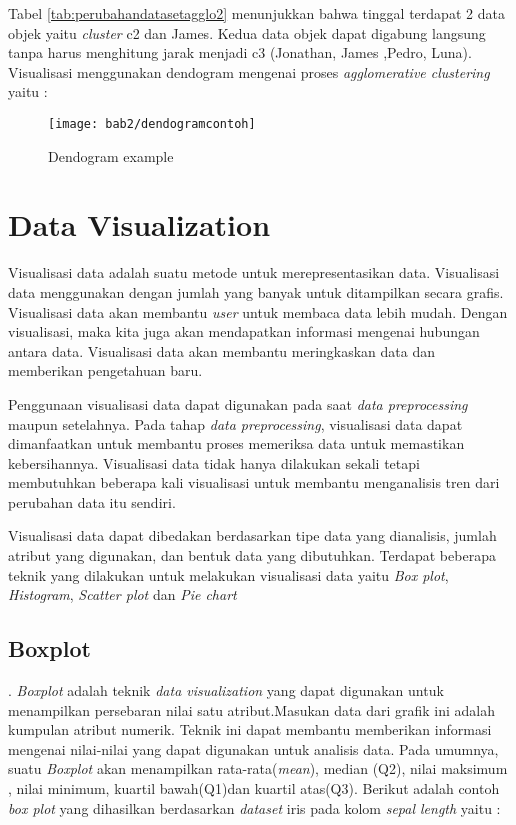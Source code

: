 Tabel \ref{tab:perubahandatasetagglo2} menunjukkan bahwa tinggal terdapat 2 data objek yaitu \textit{cluster}
c2 dan James. Kedua data objek dapat digabung langsung tanpa harus menghitung jarak menjadi c3 (Jonathan, James ,Pedro, Luna). Visualisasi menggunakan dendogram mengenai proses \textit{agglomerative clustering} yaitu : 


\begin{figure}[h!]
	\centering  
	\texttt{[image: bab2/dendogramcontoh]}   
	
	\label{ref:dendogramcontoh} 	
	\caption{Dendogram example}
\end{figure} 

\section{Data Visualization} 
Visualisasi data adalah suatu metode untuk merepresentasikan data. Visualisasi data menggunakan dengan jumlah yang banyak untuk ditampilkan secara grafis. Visualisasi data akan membantu \textit{user} untuk membaca data lebih mudah. Dengan visualisasi, maka kita juga akan mendapatkan informasi mengenai hubungan antara data. Visualisasi data akan membantu meringkaskan data dan memberikan pengetahuan baru. 
		
Penggunaan visualisasi data dapat digunakan pada saat \textit{data preprocessing} maupun setelahnya. Pada tahap \textit{data preprocessing}, visualisasi data dapat dimanfaatkan untuk membantu proses memeriksa data untuk memastikan kebersihannya. Visualisasi data tidak hanya dilakukan sekali tetapi membutuhkan beberapa kali visualisasi untuk membantu menganalisis tren dari perubahan data itu sendiri. 
		
 Visualisasi data dapat dibedakan berdasarkan tipe data yang dianalisis, jumlah atribut yang digunakan, dan bentuk data yang dibutuhkan. Terdapat beberapa teknik yang dilakukan untuk melakukan visualisasi data yaitu \textit{Box plot}, \textit{Histogram}, \textit{Scatter plot} dan \textit{Pie chart} \\
 
\subsection{\textbf{Boxplot}}.		
\textit{Boxplot} adalah teknik \textit{data visualization} yang dapat digunakan untuk menampilkan persebaran nilai satu atribut.Masukan data dari grafik ini adalah kumpulan atribut numerik. Teknik ini dapat membantu memberikan informasi mengenai nilai-nilai yang dapat digunakan untuk analisis data. Pada umumnya, suatu \textit{Boxplot} akan menampilkan rata-rata(\textit{mean}), median (Q2), nilai maksimum , nilai minimum, kuartil bawah(Q1)dan kuartil atas(Q3). Berikut adalah  contoh \textit{box plot} yang dihasilkan berdasarkan \textit{dataset} iris pada kolom \textit{sepal length} yaitu :
			
